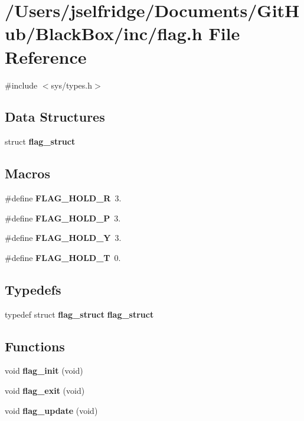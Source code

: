 \section{/\+Users/jselfridge/\+Documents/\+Git\+Hub/\+Black\+Box/inc/flag.h File Reference}
\label{flag_8h}
{\ttfamily \#include $<$sys/types.\+h$>$}\newline
\subsection*{Data Structures}
\begin{DoxyCompactItemize}
\item 
struct \textbf{ flag\+\_\+struct}
\end{DoxyCompactItemize}
\subsection*{Macros}
\begin{DoxyCompactItemize}
\item 
\#define \textbf{ F\+L\+A\+G\+\_\+\+H\+O\+L\+D\+\_\+R}~3.
\item 
\#define \textbf{ F\+L\+A\+G\+\_\+\+H\+O\+L\+D\+\_\+P}~3.
\item 
\#define \textbf{ F\+L\+A\+G\+\_\+\+H\+O\+L\+D\+\_\+Y}~3.
\item 
\#define \textbf{ F\+L\+A\+G\+\_\+\+H\+O\+L\+D\+\_\+T}~0.
\end{DoxyCompactItemize}
\subsection*{Typedefs}
\begin{DoxyCompactItemize}
\item 
typedef struct \textbf{ flag\+\_\+struct} \textbf{ flag\+\_\+struct}
\end{DoxyCompactItemize}
\subsection*{Functions}
\begin{DoxyCompactItemize}
\item 
void \textbf{ flag\+\_\+init} (void)
\item 
void \textbf{ flag\+\_\+exit} (void)
\item 
void \textbf{ flag\+\_\+update} (void)
\end{DoxyCompactItemize}
